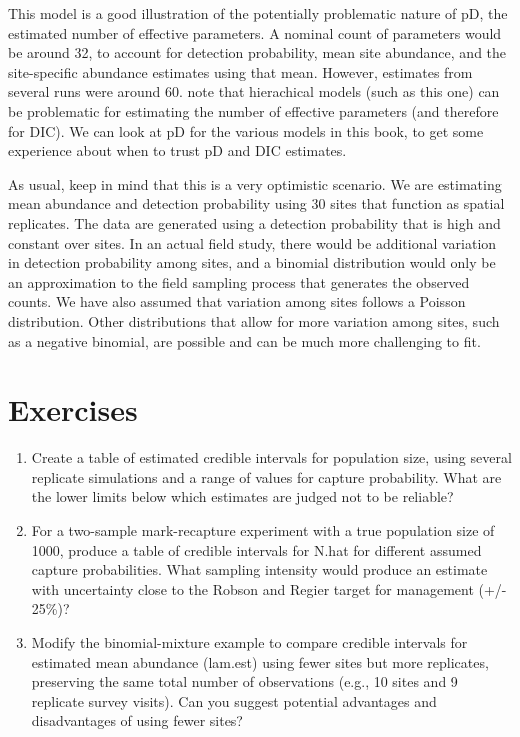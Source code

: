 \documentclass[
]{krantz}
\begin{document}
This model is a good illustration of the potentially problematic nature of pD, the estimated number of effective parameters. A nominal count of parameters would be around 32, to account for detection probability, mean site abundance, and the site-specific abundance estimates using that mean. However, estimates from several runs were around 60. \citet{kéry.schaub_2012} note that hierachical models (such as this one) can be problematic for estimating the number of effective parameters (and therefore for DIC). We can look at pD for the various models in this book, to get some experience about when to trust pD and DIC estimates.

As usual, keep in mind that this is a very optimistic scenario. We are estimating mean abundance and detection probability using 30 sites that function as spatial replicates. The data are generated using a detection probability that is high and constant over sites. In an actual field study, there would be additional variation in detection probability among sites, and a binomial distribution would only be an approximation to the field sampling process that generates the observed counts. We have also assumed that variation among sites follows a Poisson distribution. Other distributions that allow for more variation among sites, such as a negative binomial, are possible and can be much more challenging to fit.

\hypertarget{exercises-2}{%
\section{Exercises}\label{exercises-2}}

\begin{enumerate}
\def\labelenumi{\arabic{enumi}.}
\item
  Create a table of estimated credible intervals for population size, using several replicate simulations and a range of values for capture probability. What are the lower limits below which estimates are judged not to be reliable?
\item
  For a two-sample mark-recapture experiment with a true population size of 1000, produce a table of credible intervals for N.hat for different assumed capture probabilities. What sampling intensity would produce an estimate with uncertainty close to the Robson and Regier target for management (+/- 25\%)?
\item
  Modify the binomial-mixture example to compare credible intervals for estimated mean abundance (lam.est) using fewer sites but more replicates, preserving the same total number of observations (e.g., 10 sites and 9 replicate survey visits). Can you suggest potential advantages and disadvantages of using fewer sites?
\end{enumerate}
\end{document}
